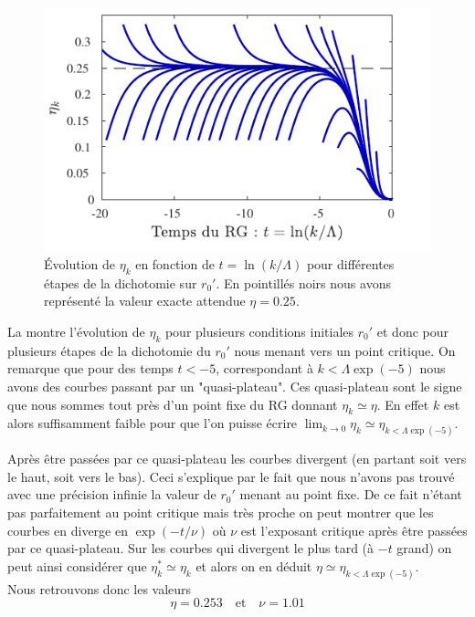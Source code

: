 \documentclass[10.5pt]{article}
\begin{document}
\begin{multicols*}{2}
\begin{figure}[H]
	\begin{center}
		\includegraphics[width=0.95\columnwidth]{etakd2.pdf}
		\caption{Évolution de $\eta_k$ en fonction de $t= \ln(k/\Lambda)$ pour différentes étapes de la dichotomie sur $r_0'$. En pointillés noirs nous avons représenté la valeur exacte attendue $\eta = 0.25$. }
		\label{fig:etakd2}
	\end{center}
\end{figure}
La  montre l'évolution de $\eta_k$ pour plusieurs conditions initiales $r_0'$ et donc pour plusieurs étapes de la dichotomie du $r_0'$ nous menant vers un point critique. On remarque que pour des temps $t<-5$, correspondant à $k < \Lambda \exp(-5)$ nous avons des courbes passant par un "quasi-plateau". Ces quasi-plateau sont le signe que nous sommes tout près d'un point fixe du RG donnant $\eta_k \simeq \eta$. En effet $k$ est alors suffisamment faible pour que l'on puisse écrire $\lim_{k\to 0} \eta_k \simeq \eta_{k<\Lambda\exp(-5)}$. 

Après être passées par ce quasi-plateau les courbes divergent (en partant soit vers le haut, soit vers le bas). Ceci s'explique par le fait que nous n'avons pas trouvé avec une précision infinie la valeur de $r_0'$ menant au point fixe. De ce fait n'étant pas parfaitement au point critique mais très proche on peut montrer que les courbes en diverge en $\exp(-t/\nu)$ où $\nu$ est l'exposant critique après être passées par ce quasi-plateau. Sur les courbes qui divergent le plus tard (à $-t$ grand) on peut ainsi considérer que 
$\eta_k^* \simeq \eta_k$ et alors on en déduit $\eta \simeq \eta_{k<\Lambda\exp(-5)}$. \\

Nous retrouvons donc les valeurs
\begin{equation}
	\eta = 0.253 \quad \text{et} \quad \nu = 1.01
\end{equation}


\end{multicols*}
\end{document}
